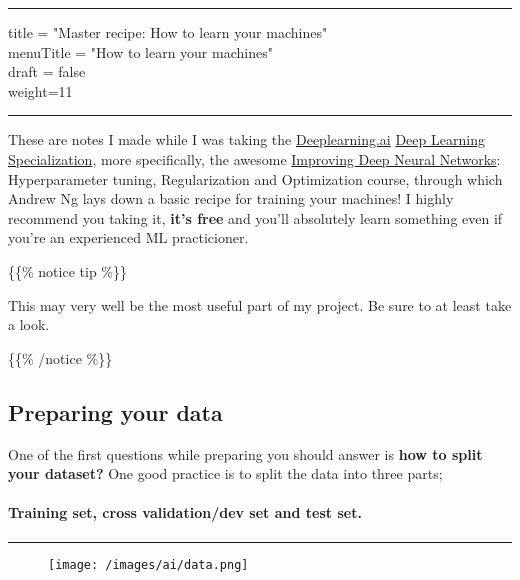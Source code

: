 \documentclass[
]{article}
\author{}
\date{}
\begin{document}
\begin{center}\rule{0.5\linewidth}{0.5pt}\end{center}

title = "Master recipe: How to learn your machines"\\
menuTitle = "How to learn your machines"\\
draft = false\\
weight=11

\begin{center}\rule{0.5\linewidth}{0.5pt}\end{center}

These are notes I made while I was taking the \url{Deeplearning.ai}
\href{https://www.coursera.org/specializations/deep-learning}{Deep
Learning Specialization}, more specifically, the awesome
\href{https://www.coursera.org/learn/deep-neural-network}{Improving Deep
Neural Networks}: Hyperparameter tuning, Regularization and Optimization
course, through which Andrew Ng lays down a basic recipe for training
your machines! I highly recommend you taking it, \textbf{it's free} and
you'll absolutely learn something even if you're an experienced ML
practicioner.

\{\{\% notice tip \%\}\}

This may very well be the most useful part of my project. Be sure to at
least take a look. 🙂

\{\{\% /notice \%\}\}

\hypertarget{header-n8}{%
\subsection{Preparing your data}\label{header-n8}}

One of the first questions while preparing you should answer is
\textbf{how to split your dataset?} One good practice is to split the
data into three parts;

\hypertarget{header-n10}{%
\paragraph{\texorpdfstring{\textbf{Training set, cross validation/dev
set and test
set.}}{Training set, cross validation/dev set and test set.}}\label{header-n10}}

\begin{center}\rule{0.5\linewidth}{0.5pt}\end{center}

\begin{figure}
\centering
\texttt{[image: /images/ai/data.png]}
\caption{}
\end{figure}
\end{document}
